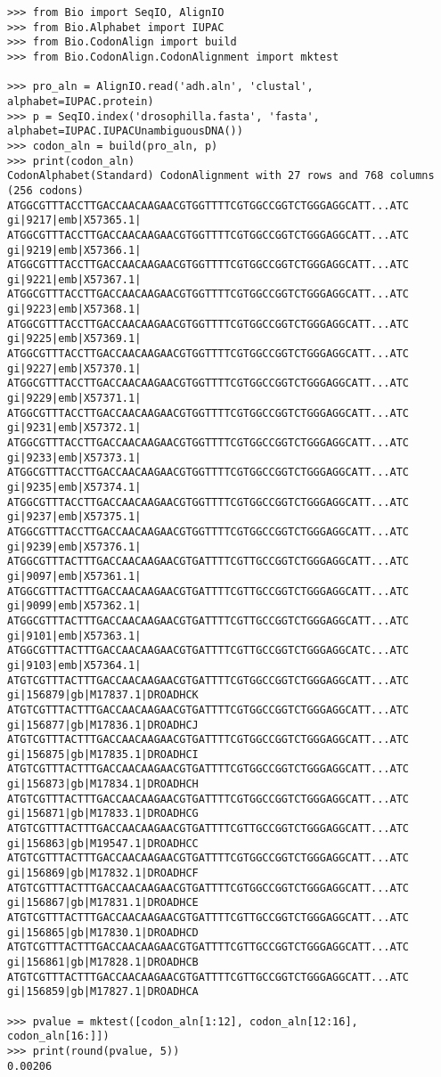 \begin{verbatim}
>>> from Bio import SeqIO, AlignIO
>>> from Bio.Alphabet import IUPAC
>>> from Bio.CodonAlign import build
>>> from Bio.CodonAlign.CodonAlignment import mktest

>>> pro_aln = AlignIO.read('adh.aln', 'clustal', alphabet=IUPAC.protein)
>>> p = SeqIO.index('drosophilla.fasta', 'fasta', alphabet=IUPAC.IUPACUnambiguousDNA())
>>> codon_aln = build(pro_aln, p)
>>> print(codon_aln)
CodonAlphabet(Standard) CodonAlignment with 27 rows and 768 columns (256 codons)
ATGGCGTTTACCTTGACCAACAAGAACGTGGTTTTCGTGGCCGGTCTGGGAGGCATT...ATC gi|9217|emb|X57365.1|
ATGGCGTTTACCTTGACCAACAAGAACGTGGTTTTCGTGGCCGGTCTGGGAGGCATT...ATC gi|9219|emb|X57366.1|
ATGGCGTTTACCTTGACCAACAAGAACGTGGTTTTCGTGGCCGGTCTGGGAGGCATT...ATC gi|9221|emb|X57367.1|
ATGGCGTTTACCTTGACCAACAAGAACGTGGTTTTCGTGGCCGGTCTGGGAGGCATT...ATC gi|9223|emb|X57368.1|
ATGGCGTTTACCTTGACCAACAAGAACGTGGTTTTCGTGGCCGGTCTGGGAGGCATT...ATC gi|9225|emb|X57369.1|
ATGGCGTTTACCTTGACCAACAAGAACGTGGTTTTCGTGGCCGGTCTGGGAGGCATT...ATC gi|9227|emb|X57370.1|
ATGGCGTTTACCTTGACCAACAAGAACGTGGTTTTCGTGGCCGGTCTGGGAGGCATT...ATC gi|9229|emb|X57371.1|
ATGGCGTTTACCTTGACCAACAAGAACGTGGTTTTCGTGGCCGGTCTGGGAGGCATT...ATC gi|9231|emb|X57372.1|
ATGGCGTTTACCTTGACCAACAAGAACGTGGTTTTCGTGGCCGGTCTGGGAGGCATT...ATC gi|9233|emb|X57373.1|
ATGGCGTTTACCTTGACCAACAAGAACGTGGTTTTCGTGGCCGGTCTGGGAGGCATT...ATC gi|9235|emb|X57374.1|
ATGGCGTTTACCTTGACCAACAAGAACGTGGTTTTCGTGGCCGGTCTGGGAGGCATT...ATC gi|9237|emb|X57375.1|
ATGGCGTTTACCTTGACCAACAAGAACGTGGTTTTCGTGGCCGGTCTGGGAGGCATT...ATC gi|9239|emb|X57376.1|
ATGGCGTTTACTTTGACCAACAAGAACGTGATTTTCGTTGCCGGTCTGGGAGGCATT...ATC gi|9097|emb|X57361.1|
ATGGCGTTTACTTTGACCAACAAGAACGTGATTTTCGTTGCCGGTCTGGGAGGCATT...ATC gi|9099|emb|X57362.1|
ATGGCGTTTACTTTGACCAACAAGAACGTGATTTTCGTTGCCGGTCTGGGAGGCATT...ATC gi|9101|emb|X57363.1|
ATGGCGTTTACTTTGACCAACAAGAACGTGATTTTCGTTGCCGGTCTGGGAGGCATC...ATC gi|9103|emb|X57364.1|
ATGTCGTTTACTTTGACCAACAAGAACGTGATTTTCGTGGCCGGTCTGGGAGGCATT...ATC gi|156879|gb|M17837.1|DROADHCK
ATGTCGTTTACTTTGACCAACAAGAACGTGATTTTCGTGGCCGGTCTGGGAGGCATT...ATC gi|156877|gb|M17836.1|DROADHCJ
ATGTCGTTTACTTTGACCAACAAGAACGTGATTTTCGTGGCCGGTCTGGGAGGCATT...ATC gi|156875|gb|M17835.1|DROADHCI
ATGTCGTTTACTTTGACCAACAAGAACGTGATTTTCGTGGCCGGTCTGGGAGGCATT...ATC gi|156873|gb|M17834.1|DROADHCH
ATGTCGTTTACTTTGACCAACAAGAACGTGATTTTCGTGGCCGGTCTGGGAGGCATT...ATC gi|156871|gb|M17833.1|DROADHCG
ATGTCGTTTACTTTGACCAACAAGAACGTGATTTTCGTTGCCGGTCTGGGAGGCATT...ATC gi|156863|gb|M19547.1|DROADHCC
ATGTCGTTTACTTTGACCAACAAGAACGTGATTTTCGTGGCCGGTCTGGGAGGCATT...ATC gi|156869|gb|M17832.1|DROADHCF
ATGTCGTTTACTTTGACCAACAAGAACGTGATTTTCGTGGCCGGTCTGGGAGGCATT...ATC gi|156867|gb|M17831.1|DROADHCE
ATGTCGTTTACTTTGACCAACAAGAACGTGATTTTCGTTGCCGGTCTGGGAGGCATT...ATC gi|156865|gb|M17830.1|DROADHCD
ATGTCGTTTACTTTGACCAACAAGAACGTGATTTTCGTTGCCGGTCTGGGAGGCATT...ATC gi|156861|gb|M17828.1|DROADHCB
ATGTCGTTTACTTTGACCAACAAGAACGTGATTTTCGTTGCCGGTCTGGGAGGCATT...ATC gi|156859|gb|M17827.1|DROADHCA

>>> pvalue = mktest([codon_aln[1:12], codon_aln[12:16], codon_aln[16:]])
>>> print(round(pvalue, 5))
0.00206
\end{verbatim}

